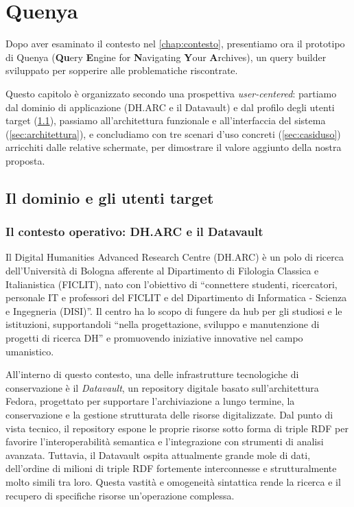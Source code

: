 \chapter{Quenya}\label{chap:prototipo}

    Dopo aver esaminato il contesto nel \cref{chap:contesto}, presentiamo ora il prototipo di Quenya (\textbf{Qu}ery \textbf{E}ngine for \textbf{N}avigating \textbf{Y}our \textbf{A}rchives), un query builder sviluppato per sopperire alle problematiche riscontrate.

    Questo capitolo è organizzato secondo una prospettiva \textit{user-centered}: partiamo dal dominio di applicazione (DH.ARC e il Datavault) e dal profilo degli utenti target (\cref{sec:dominio}), passiamo all'architettura funzionale e all'interfaccia del sistema (\cref{sec:architettura}), e concludiamo con tre scenari d'uso concreti (\cref{sec:casiduso}) arricchiti dalle relative schermate, per dimostrare il valore aggiunto della nostra proposta.

\section{Il dominio e gli utenti target}\label{sec:dominio}

    \subsection{Il contesto operativo: DH.ARC e il Datavault}\label{subsec:dharc}
        Il Digital Humanities Advanced Research Centre (DH.ARC) è un polo di ricerca dell'Università di Bologna afferente al Dipartimento di Filologia Classica e Italianistica (FICLIT), nato con l'obiettivo di ``connettere studenti, ricercatori, personale IT e professori del FICLIT e del Dipartimento di Informatica \-- Scienza e Ingegneria (DISI)''.
        Il centro ha lo scopo di fungere da hub per gli studiosi e le istituzioni, supportandoli ``nella progettazione, sviluppo e manutenzione di progetti di ricerca DH'' e promuovendo iniziative innovative nel campo umanistico.

        All'interno di questo contesto, una delle infrastrutture tecnologiche di conservazione è il \textit{Datavault}, un repository digitale basato sull'architettura Fedora, progettato per supportare l'archiviazione a lungo termine, la conservazione e la gestione strutturata delle risorse digitalizzate. 
        Dal punto di vista tecnico, il repository espone le proprie risorse sotto forma di triple RDF per favorire l'interoperabilità semantica e l'integrazione con strumenti di analisi avanzata.\cite{Far25}
        Tuttavia, il Datavault ospita attualmente grande mole di dati, dell'ordine di milioni di triple RDF fortemente interconnesse e strutturalmente molto simili tra loro.
        Questa vastità e omogeneità sintattica rende la ricerca e il recupero di specifiche risorse un'operazione complessa.

